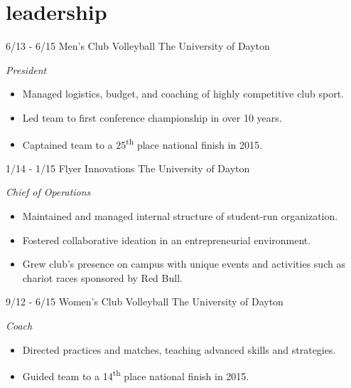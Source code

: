 \documentclass[print]{resume}
\begin{document}
\section{leadership}
\begin{entrylist}

\entry
{6/13 - 6/15}
{Men's Club Volleyball}
{The University of Dayton}
{
\emph{President}
\begin{itemize}
    \item Managed logistics, budget, and coaching of highly competitive club sport.
    \item Led team to first conference championship in over 10 years. 
    \item Captained team to a 25\textsuperscript{th} place national finish in 2015.
\end{itemize}
}

\entry
{1/14 - 1/15}
{Flyer Innovations}
{The University of Dayton}
{
\emph{Chief of Operations} 
\begin{itemize}
    \item Maintained and managed internal structure of student-run organization. 
    \item Fostered collaborative ideation in an entrepreneurial environment. 
    \item Grew club's presence on campus with unique events and activities such as chariot 
    races sponsored by Red Bull.
\end{itemize}
}

\entry
{9/12 - 6/15}
{Women's Club Volleyball}
{The University of Dayton}
{
\emph{Coach}
\begin{itemize}
    \item Directed practices and matches, teaching advanced skills and strategies.
    \item Guided team to a 14\textsuperscript{th} place national finish in 2015.
\end{itemize}
}

\end{entrylist}

\end{document}
